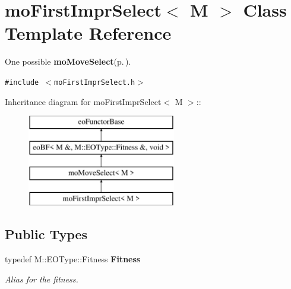\section{mo\-First\-Impr\-Select$<$ M $>$ Class Template Reference}
\label{classmo_first_impr_select}
One possible {\bf mo\-Move\-Select}{\rm (p.\,\pageref{classmo_move_select})}.  


{\tt \#include $<$mo\-First\-Impr\-Select.h$>$}

Inheritance diagram for mo\-First\-Impr\-Select$<$ M $>$::\begin{figure}[H]
\begin{center}
\leavevmode
\includegraphics[height=4cm]{classmo_first_impr_select}
\end{center}
\end{figure}
\subsection*{Public Types}
\begin{CompactItemize}
\item 
typedef M::EOType::Fitness {\bf Fitness}\label{classmo_first_impr_select_w0}

\begin{CompactList}\small\item\em Alias for the fitness. \item\end{CompactList}\end{CompactItemize}

